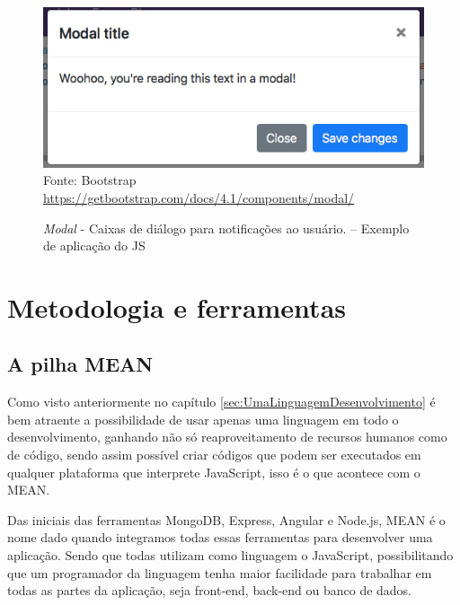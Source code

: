 \documentclass[
	12pt,				%
	openright,			%
	twoside,			%
	a4paper,			%
	english,			%
	brazil				%
	]{abntex2}
\begin{document}
\begin{figure}[h]
    \caption{\textit{Modal} - Caixas de diálogo para notificações ao usuário. -- Exemplo de aplicação do JS} \label{fig:JSExampleModal}
    \includegraphics[scale=0.5]{js-example-modal} \\
    Fonte: {Bootstrap \url{https://getbootstrap.com/docs/4.1/components/modal/}}

\end{figure}

\chapter{Metodologia e ferramentas}

\section{A pilha MEAN}

Como visto anteriormente no capítulo \ref{sec:UmaLinguagemDesenvolvimento} é bem atraente a possibilidade de usar apenas uma linguagem em todo o desenvolvimento, ganhando não só reaproveitamento de recursos humanos como de código, sendo assim possível criar códigos que podem ser executados em qualquer plataforma que interprete JavaScript, isso é o que acontece com o MEAN.

Das iniciais das ferramentas MongoDB, Express, Angular e Node.js, MEAN é o nome dado quando integramos todas essas ferramentas para desenvolver uma aplicação. Sendo que todas utilizam como linguagem o JavaScript, possibilitando que um programador da linguagem tenha maior facilidade para trabalhar em todas as partes da aplicação, seja front-end, back-end ou banco de dados.
\end{document}
